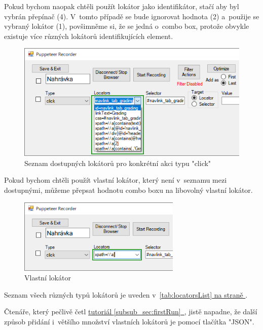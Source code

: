\documentclass[12pt, a4paper, twoside]{article}
\newcommand{\refFullAddedText}[3]{\hyperref[#1]{#2\ref{#1}~\nameref{#1}#3}}
\begin{document}
	Pokud bychom naopak chtěli použít lokátor jako identifikátor, stačí aby byl vybrán přepínač (4). V~tomto případě se bude ignorovat hodnota (2) a~použije se vybraný lokátor (1), povšimněme si, že se jedná o~combo box, protože obvykle existuje více různých lokátorů identifikujících element.
	\begin{figure}[H]
		\centering
		\includegraphics[width=1.0\textwidth]{allLocators.png}
		\caption{Seznam dostupných lokátorů pro konkrétní akci typu "click"}
	\end{figure}
	\newpage
	Pokud bychom chtěli použít vlastní lokátor, který není v~seznamu mezi dostupnými, můžeme přepsat hodnotu combo boxu na libovolný vlastní lokátor.
	\nopagebreak
	\begin{figure}[H]
		\centering
		\includegraphics[width=0.69\textwidth]{customLocator.png}
		\caption{Vlastní lokátor}
	\end{figure}
	Seznam všech různých typů lokátorů je uveden
v~\hyperref[tab:locatorsList]{\cref{tab:locatorsList} na straně \pageref{tab:locatorsList}}.
	
	Čtenáře, který pečlivě četl \refFullAddedText{subsub_sec:firstRun}{tutoriál }{}, jistě napadne, že další způsob přidání i~většího množství vlastních lokátorů je pomocí tlačítka "JSON". 
	
\end{document}
